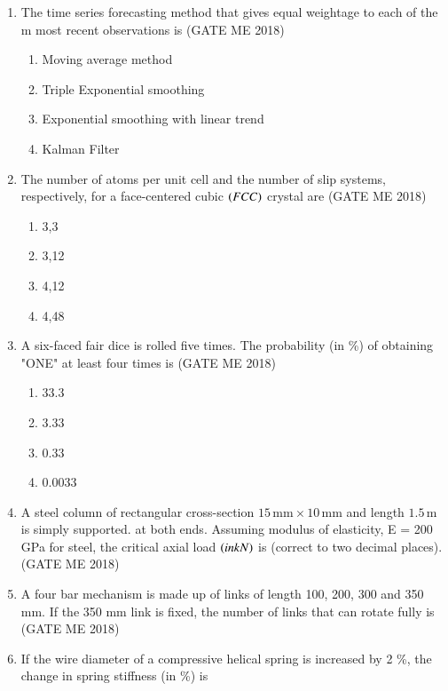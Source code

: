 \documentclass[journal]{IEEEtran}
\numberwithin{equation}{enumi}
\numberwithin{figure}{enumi}
\begin{document}
\begin{enumerate}
\begin{enumerate}
\end{enumerate}
\item 
The time series forecasting method that gives equal weightage to each of the m most recent observations is
\hfill{(GATE ME 2018)}
\begin{enumerate}
\item Moving average method
\item  Triple Exponential smoothing
\item  Exponential smoothing with linear trend
\item  Kalman Filter
\end{enumerate}

\item The number of atoms per unit cell and the number of slip systems, respectively, for a face-centered cubic $\left(FCC\right)$ crystal are
\hfill{(GATE ME 2018)}
\begin{multicols}{4}
    \begin{enumerate}
        \item  3,3
        \item 3,12
        \item 4,12
        \item 4,48
    \end{enumerate}
\end{multicols}
 
\item A six-faced fair dice is rolled five times. The probability (in \%) of obtaining "ONE" at least four times is
\hfill{(GATE ME 2018)}
\begin{multicols}{4}
    \begin{enumerate}
     \item  33.3
\item 3.33

\item  0.33

\item  0.0033
    \end{enumerate}
\end{multicols}
 \item A steel column of rectangular cross-section \( 15\,\text{mm} \times 10\,\text{mm} \) and length \( 1.5\,\text{m} \) is simply supported.
at both ends. Assuming modulus of elasticity, E = 200 GPa for steel, the critical axial load
$\left(in kN\right)$ is
(correct to two decimal places).
\hfill{(GATE ME 2018)}

\item A four bar mechanism is made up of links of length 100, 200, 300 and 350 mm. If the 350 mm link is fixed, the number of links that can rotate fully is
\hfill{(GATE ME 2018)}
\item If the wire diameter of a compressive helical spring is increased by 2 \%, the change in spring
stiffness (in \%) is


\end{enumerate}
\end{document}
